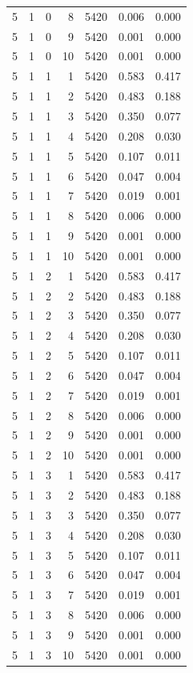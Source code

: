\begin{table}
\begin{tabular}{rrrrrrr}
5 & 1 & 0 & 8 & 5420 & 0.006 & 0.000 \\
5 & 1 & 0 & 9 & 5420 & 0.001 & 0.000 \\
5 & 1 & 0 & 10 & 5420 & 0.001 & 0.000 \\
5 & 1 & 1 & 1 & 5420 & 0.583 & 0.417 \\
5 & 1 & 1 & 2 & 5420 & 0.483 & 0.188 \\
5 & 1 & 1 & 3 & 5420 & 0.350 & 0.077 \\
5 & 1 & 1 & 4 & 5420 & 0.208 & 0.030 \\
5 & 1 & 1 & 5 & 5420 & 0.107 & 0.011 \\
5 & 1 & 1 & 6 & 5420 & 0.047 & 0.004 \\
5 & 1 & 1 & 7 & 5420 & 0.019 & 0.001 \\
5 & 1 & 1 & 8 & 5420 & 0.006 & 0.000 \\
5 & 1 & 1 & 9 & 5420 & 0.001 & 0.000 \\
5 & 1 & 1 & 10 & 5420 & 0.001 & 0.000 \\
5 & 1 & 2 & 1 & 5420 & 0.583 & 0.417 \\
5 & 1 & 2 & 2 & 5420 & 0.483 & 0.188 \\
5 & 1 & 2 & 3 & 5420 & 0.350 & 0.077 \\
5 & 1 & 2 & 4 & 5420 & 0.208 & 0.030 \\
5 & 1 & 2 & 5 & 5420 & 0.107 & 0.011 \\
5 & 1 & 2 & 6 & 5420 & 0.047 & 0.004 \\
5 & 1 & 2 & 7 & 5420 & 0.019 & 0.001 \\
5 & 1 & 2 & 8 & 5420 & 0.006 & 0.000 \\
5 & 1 & 2 & 9 & 5420 & 0.001 & 0.000 \\
5 & 1 & 2 & 10 & 5420 & 0.001 & 0.000 \\
5 & 1 & 3 & 1 & 5420 & 0.583 & 0.417 \\
5 & 1 & 3 & 2 & 5420 & 0.483 & 0.188 \\
5 & 1 & 3 & 3 & 5420 & 0.350 & 0.077 \\
5 & 1 & 3 & 4 & 5420 & 0.208 & 0.030 \\
5 & 1 & 3 & 5 & 5420 & 0.107 & 0.011 \\
5 & 1 & 3 & 6 & 5420 & 0.047 & 0.004 \\
5 & 1 & 3 & 7 & 5420 & 0.019 & 0.001 \\
5 & 1 & 3 & 8 & 5420 & 0.006 & 0.000 \\
5 & 1 & 3 & 9 & 5420 & 0.001 & 0.000 \\
5 & 1 & 3 & 10 & 5420 & 0.001 & 0.000 \\

\end{tabular}
\end{table}
